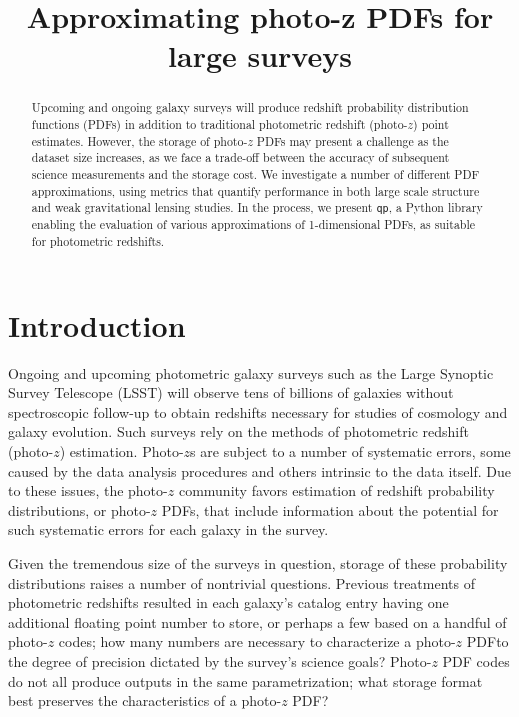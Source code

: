 \documentclass[\docopts]{\docclass}
\newcommand{\qp}{\texttt{qp}}
\newcommand{\pz}{photo-$z$ PDF}
\newcommand{\Pz}{Photo-$z$ PDF}
\begin{document}
\title{ Approximating photo-z PDFs for large surveys }


\begin{abstract}

Upcoming and ongoing galaxy surveys will produce redshift probability 
distribution functions (PDFs) in addition to traditional photometric redshift 
(photo-$z$) point estimates.  However, the storage of \pz s may present a 
challenge as the dataset size increases, as we face a trade-off between the 
accuracy of subsequent science measurements and the storage cost. We 
investigate a number of different PDF approximations, using metrics that 
quantify performance in both large scale structure and weak gravitational 
lensing studies. In the process, we present \qp, a Python library enabling the 
evaluation of various approximations of 1-dimensional PDFs, as suitable for 
photometric redshifts.

\end{abstract}






\section{Introduction}
\label{sec:intro}


Ongoing and upcoming photometric galaxy surveys such as the Large Synoptic 
Survey Telescope (LSST) will observe tens of billions of galaxies without 
spectroscopic follow-up to obtain redshifts necessary for studies of cosmology 
and galaxy evolution.  Such surveys rely on the methods of photometric redshift 
(photo-$z$) estimation.  Photo-$z$s are subject to a number of systematic 
errors, some caused by the data analysis procedures and others intrinsic to the 
data itself.  Due to these issues, the photo-$z$ community favors estimation of 
redshift probability distributions, or \pz s, that include information about 
the potential for such systematic errors for each galaxy in the survey.

Given the tremendous size of the surveys in question, storage of these 
probability distributions raises a number of nontrivial questions.  Previous 
treatments of photometric redshifts resulted in each galaxy's catalog entry 
having one additional floating point number to store, or perhaps a few based on 
a handful of photo-$z$ codes; how many numbers are necessary to characterize a 
\pz to the degree of precision dictated by the survey's science goals?  \Pz  
codes do not all produce outputs in the same parametrization; what storage 
format best preserves the characteristics of a \pz ?
\end{document}

